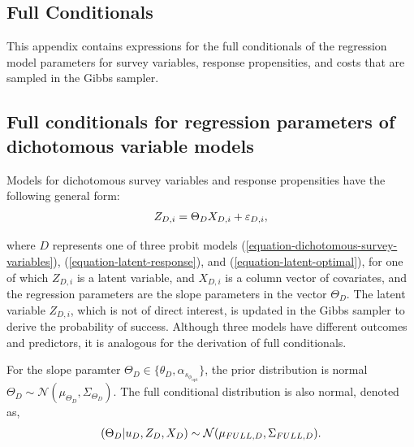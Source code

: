 \documentclass[12pt]{article}
\begin{document}
\clearpage
\appendix


\begin{appendices}
\section{Full Conditionals}
\label{appendix-full-conditionals}

This appendix contains expressions for the full conditionals of the regression model parameters for survey variables, response propensities, and costs that are sampled in the Gibbs sampler.

\subsection{Full conditionals for regression parameters of dichotomous variable models}
\label{appendix-full-conditionals-dichotomous-variables}

Models for dichotomous survey variables and response propensities have the following general form:
\let\saveeqnno\theequation
\let\savefrac\frac
\def\dispfrac{\displaystyle\savefrac}
\begin{eqnarray*}
\let\frac\dispfrac
\let\theHequation\theequation
	Z_{D,i}=\Theta_{D}X_{D,i}+\varepsilon_{D,i},
\end{eqnarray*}
\global\let\theequation\saveeqnno
\addtocounter{equation}{-1}\ignorespaces

where $D$ represents one of three probit models (\ref{equation-dichotomous-survey-variables}), (\ref{equation-latent-response}), and (\ref{equation-latent-optimal}), for one of which $Z_{D,i}$ is a latent variable, and $X_{D,i}$ is a column vector of covariates, and the regression parameters are the slope parameters in the vector $\Theta_D$.
The latent variable $Z_{D,i}$, which is not of direct interest, is updated in the Gibbs sampler to derive the probability of success.
Although three models have different outcomes and predictors, it is analogous for the derivation of full conditionals.

For the slope paramter $\Theta_D \in \{\theta_D,\alpha_{s_{\phi_{\mathrm{opt}}}}\}$, the prior distribution is normal $\Theta_D \sim \mathcal{N}\left(\mu_{\Theta_D},\Sigma_{\Theta_D}\right)$.
The full conditional distribution is also normal, denoted as,
\let\saveeqnno\theequation
\let\savefrac\frac
\def\dispfrac{\displaystyle\savefrac}
\begin{eqnarray}
\let\frac\dispfrac
\gdef\theequation{A1}
\let\theHequation\theequation
\label{equation-full-conditionals-dichotomous}
	(\Theta_{D}|u_D,Z_D,X_D) \sim \mathcal{N}(\mu_{FULL,D},\Sigma_{FULL,D}).
\end{eqnarray}
\global\let\theequation\saveeqnno
\addtocounter{equation}{-1}\ignorespaces


\end{appendices}
\end{document}
